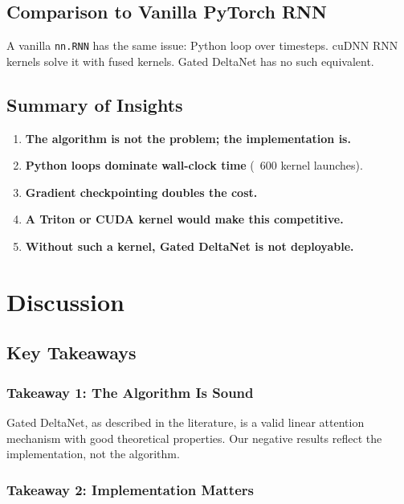 \subsection{Comparison to Vanilla PyTorch RNN}

A vanilla \texttt{nn.RNN} has the same issue: Python loop over timesteps. cuDNN 
RNN kernels solve it with fused kernels. Gated DeltaNet has no such 
equivalent.

\subsection{Summary of Insights}

\begin{enumerate}
\item \textbf{The algorithm is not the problem; the implementation is.}
\item \textbf{Python loops dominate wall-clock time} (~600 kernel launches).
\item \textbf{Gradient checkpointing doubles the cost.}
\item \textbf{A Triton or CUDA kernel would make this competitive.}
\item \textbf{Without such a kernel, Gated DeltaNet is not deployable.}

\end{enumerate}



\section{Discussion}

\subsection{Key Takeaways}

\subsubsection{Takeaway 1: The Algorithm Is Sound}

Gated DeltaNet, as described in the literature, is a valid linear attention 
mechanism with good theoretical properties. Our negative results reflect 
the implementation, not the algorithm.

\subsubsection{Takeaway 2: Implementation Matters}

